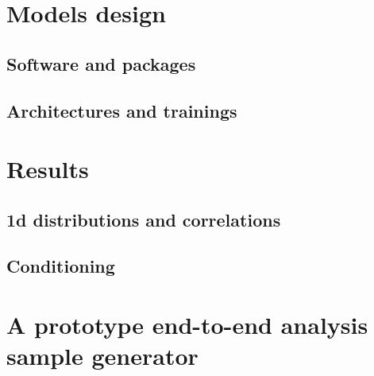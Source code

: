 \section{Models design}

\subsection{Software and packages}

\subsection{Architectures and trainings}

\section{Results}

\subsection{1d distributions and correlations}

\subsection{Conditioning}

\section{A prototype end-to-end analysis sample generator}

